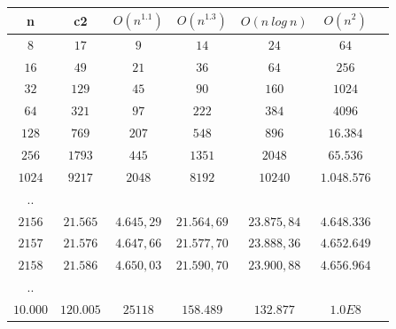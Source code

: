\setlength{\tabcolsep}{0.8em}
{\renewcommand{\arraystretch}{1.7}%
\begin{table} %
    \begin{center}
        \begin{tabular}{|c |c |c |c | c| c| c}
            \hline
            \textbf{n} & \textbf{c2}  &  \textbf{$O(n^{1.1})$} & \textbf{$O(n^{1.3})$} & \textbf{$O(n\ log\ n)$} & \textbf{$O(n^2)$}  \\


            \hline
            $8$ & $17$  & \cellcolor{green!25}$9$ & \cellcolor{green!25}$14$ &  \cellcolor{red!25}$24$ & \cellcolor{red!25}$64$\\
            \hline
            $16$ & $49$ & \cellcolor{green!25}$21$ & \cellcolor{green!25}$36$ &\cellcolor{red!25}$64$ & \cellcolor{red!25}$256$ \\
            \hline
            $32$ & $129$ &  \cellcolor{green!25}$45$ & \cellcolor{green!25}$90$ & \cellcolor{red!25}$160$ &\cellcolor{red!25}$1024$ \\
            \hline
            $64$ & $321$ &  \cellcolor{green!25}$97$ & \cellcolor{green!25}$222$ & \cellcolor{red!25}$384$ & \cellcolor{red!25}$4096$ \\
            \hline
            $128$ & $769$ &   \cellcolor{green!25}$207$ & \cellcolor{green!25}$548$ & \cellcolor{red!25}$896$ & \cellcolor{red!25}$16.384$ \\

            \hline
            $256$ & $1793$ &   \cellcolor{green!25}$445$ & \cellcolor{green!25}$1351$ & \cellcolor{red!25}$2048$ & \cellcolor{red!25}$65.536$ \\
            \hline

            $1024$ & $9217$ &   \cellcolor{green!25}$2048$ & \cellcolor{green!25}$8192$ & \cellcolor{red!25}$10240$ & \cellcolor{red!25}$1.048.576$ \\
            \hline

            .. & & & & &  \\
            \hline
            $2156$ & $21.565$ &   \cellcolor{green!25}$4.645,29$ & \cellcolor{green!25}$21.564,69$ & \cellcolor{red!25}$23.875,84$ &\cellcolor{red!25}$4.648.336$ \\  \hline
            $2157$ & $21.576$ &  \cellcolor{green!25}$4.647,66$ & \cellcolor{red!25}$21.577,70$ & \cellcolor{red!25}$23.888,36$ &\cellcolor{red!25}$4.652.649$  \\  \hline
            $2158$ & $21.586$ &  \cellcolor{green!25}$4.650,03$ & \cellcolor{red!25}$21.590,70$ & \cellcolor{red!25}$23.900,88$ & \cellcolor{red!25}$4.656.964$  \\
            \hline
            ..  & & & & &  \\
            \hline
            $10.000$ & $120.005$ &    \cellcolor{green!25}$25118$ & \cellcolor{red!25}$158.489$ & \cellcolor{yellow!25}$132.877$ &\cellcolor{red!25}$1.0E8$ \\
            \hline


\end{tabular}
\end{center}
\end{table}}
